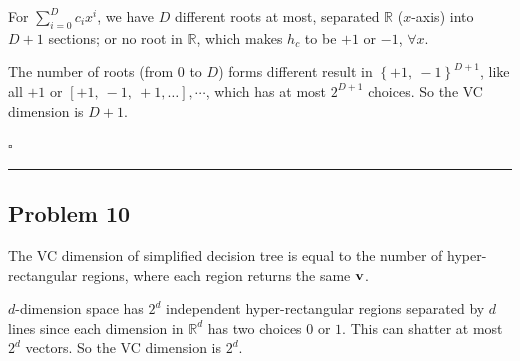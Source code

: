 \documentclass[12pt]{article}
\newcommand*{\QEDB}{\hfill\ensuremath{\square}}
\newcommand{\CBrackets}[1]{\left\{#1\right\}}
\newcommand{\SBrackets}[1]{\left[#1\right]}
\newcommand{\ParTh}[1]{\left(#1\right)}
\newcommand{\BF}[1]{{\bf#1}}
\newcommand{\horrule}[1]{\rule{\linewidth}{#1}}
\begin{document}

For $\sum_{i=0}^{D}c_ix^i$, we have $D$ different roots at most, separated $\mathbb{R}$ ($x$-axis) into $D+1$ sections; or no root in $\mathbb{R}$, which makes $h_c$ to be $+1$ or $-1$, $\forall x$.

The number of roots (from $0$ to $D$) forms different result in $\CBrackets{+1,~-1}^{D+1}$, like all $+1$ or $\SBrackets{+1,~-1,~+1,\ldots},\cdots$, which has at most $2^{D+1}$ choices. So the VC dimension is $D+1$.

\QEDB

\horrule{0.5pt}

\subsection*{Problem 10}

The VC dimension of simplified decision tree is equal to the number of hyper-rectangular regions, where each region returns the same $\BF{v}$.

$d$-dimension space has $2^d$ independent hyper-rectangular regions separated by $d$ lines since each dimension in $\mathbb{R}^d$ has two choices $0$ or $1$. This can shatter at most $2^d$ vectors. So the VC dimension is $2^d$.
\end{document}
